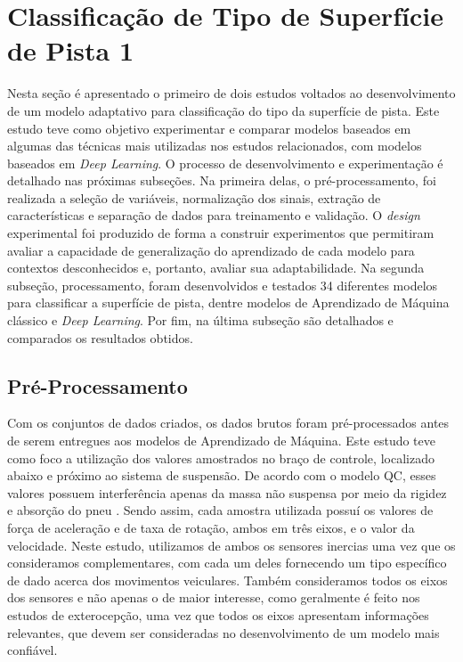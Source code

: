 \chapter{Classificação de Tipo de Superfície de Pista 1}
\label{cap:classificacao_tipo_superficie_1}

Nesta seção é apresentado o primeiro de dois estudos voltados ao desenvolvimento de um modelo adaptativo para classificação do tipo da superfície de pista. Este estudo teve como objetivo experimentar e comparar modelos baseados em algumas das técnicas mais utilizadas nos estudos relacionados, com modelos baseados em \textit{Deep Learning}. O processo de desenvolvimento e experimentação é detalhado nas próximas subseções. Na primeira delas, o pré-processamento, foi realizada a seleção de variáveis, normalização dos sinais, extração de características e separação de dados para treinamento e validação. O \textit{design} experimental foi produzido de forma a construir experimentos que permitiram avaliar a capacidade de generalização do aprendizado de cada modelo para contextos desconhecidos e, portanto, avaliar sua adaptabilidade. Na segunda subseção, processamento, foram desenvolvidos e testados 34 diferentes modelos para classificar a superfície de pista, dentre modelos de Aprendizado de Máquina clássico e \textit{Deep Learning}. Por fim, na última subseção são detalhados e comparados os resultados obtidos. 

\section{Pré-Processamento}

Com os conjuntos de dados criados, os dados brutos foram pré-processados antes de serem entregues aos modelos de Aprendizado de Máquina. Este estudo teve como foco a utilização dos valores amostrados no braço de controle, localizado abaixo e próximo ao sistema de suspensão. De acordo com o modelo QC, esses valores possuem interferência apenas da massa não suspensa por meio da rigidez e absorção do pneu \cite{Yafeai2019}. Sendo assim, cada amostra utilizada possuí os valores de força de aceleração e de taxa de rotação, ambos em três eixos, e o valor da velocidade. Neste estudo, utilizamos de ambos os sensores inercias uma vez que os consideramos complementares, com cada um deles fornecendo um tipo específico de dado acerca dos movimentos veiculares. Também consideramos todos os eixos dos sensores e não apenas o de maior interesse, como geralmente é feito nos estudos de exterocepção, uma vez que todos os eixos apresentam informações relevantes, que devem ser consideradas no desenvolvimento de um modelo mais confiável.

